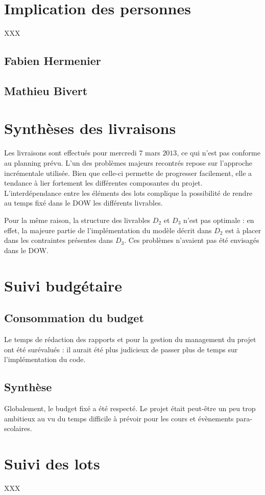 \documentclass[a4paper]{article}
\begin{document}
\section{Implication des personnes}
XXX
\subsection{Fabien Hermenier}
\subsection{Mathieu Bivert}

\section{Synthèses des livraisons}
Les livraisons sont effectués pour mercredi $7$ mars $2013$, ce qui n'est
pas conforme au planning prévu. L'un des problèmes majeurs recontrés
repose sur l'approche incrémentale utilisée. Bien que celle-ci permette
de progresser facilement, elle a tendance à lier fortement les différentes
composantes du projet. L'interdépendance entre les éléments des lots complique
la possibilité de rendre au temps fixé dans le DOW les différents livrables.

Pour la même raison, la structure des livrables $D_2$ et $D_3$ n'est pas
optimale : en effet, la majeure partie de l'implémentation du modèle décrit
dans $D_2$ est à placer dans les contraintes présentes dans $D_3$. Ces
problèmes n'avaient pas été envisagés dans le DOW.

\section{Suivi budgétaire}
\subsection{Consommation du budget}
Le temps de rédaction des rapports et pour la gestion du management du projet
ont été surévalués : il aurait été plus judicieux de passer plus de temps
sur l'implémentation du code.
\subsection{Synthèse}
Globalement, le budget fixé a été respecté. Le projet était peut-être un
peu trop ambitieux au vu du temps difficile à prévoir pour les cours et
évènements para-scolaires.
\section{Suivi des lots}
XXX
\end{document}
